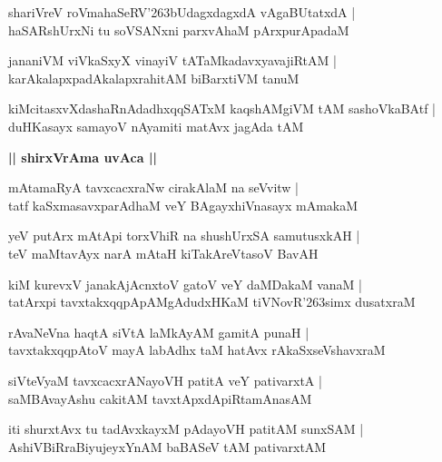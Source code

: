 \documentclass[twoside,12pt,openright]{book}
\def\S{\char'263}
\newcounter{shloka}[chapter]
\def\uvaca#1{\centerline{{\large\textbf{#1}}}}
\begin{document}
\begin{shloka}%
shariVreV roVmahaSeRV\S bUdagxdagxdA vAgaBUtatxdA |\\
haSARshUrxNi tu soVSANxni parxvAhaM pArxpurApadaM 
\end{shloka}

\begin{shloka}%
jananiVM viVkaSxyX vinayiV tATaMkadavxyavajiRtAM |\\
karAkalapxpadAkalapxrahitAM biBarxtiVM tanuM 
\end{shloka}

\begin{shloka}%
kiMcitasxvXdashaRnAdadhxqqSATxM kaqshAMgiVM tAM sashoVkaBAtf |\\
duHKasayx samayoV nAyamiti matAvx jagAda tAM 
\end{shloka}

\uvaca{|| shirxVrAma uvAca ||}

\begin{shloka}%
mAtamaRyA tavxcacxraNw cirakAlaM na seVvitw |\\
tatf kaSxmasavxparAdhaM veY BAgayxhiVnasayx mAmakaM
\end{shloka}

\begin{shloka}%
yeV putArx mAtApi torxVhiR na shushUrxSA samutusxkAH |\\
teV maMtavAyx narA mAtaH kiTakAreVtasoV BavAH 
\end{shloka}

\begin{shloka}%
kiM kurevxV janakAjAcnxtoV gatoV veY daMDakaM vanaM |\\
tatArxpi tavxtakxqqpApAMgAdudxHKaM tiVNovR\S simx dusatxraM 
\end{shloka}

\begin{shloka}%
rAvaNeVna haqtA siVtA laMkAyAM gamitA punaH |\\
tavxtakxqqpAtoV mayA labAdhx taM hatAvx rAkaSxseVshavxraM 
\end{shloka}

\begin{shloka}%
siVteVyaM tavxcacxrANayoVH patitA veY pativarxtA |\\
saMBAvayAshu cakitAM tavxtApxdApiRtamAnasAM 
\end{shloka}

\begin{shloka}%
iti shurxtAvx tu tadAvxkayxM pAdayoVH patitAM sunxSAM |\\
AshiVBiRraBiyujeyxYnAM baBASeV tAM pativarxtAM 
\end{shloka}
\end{document}
